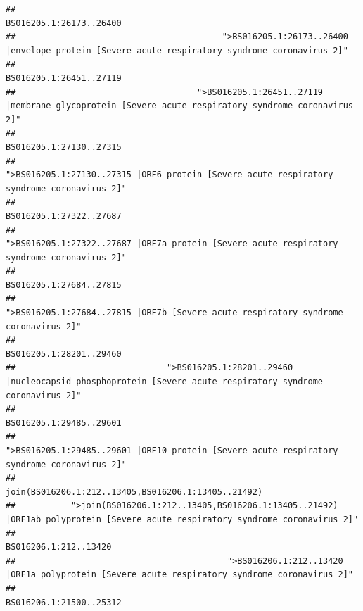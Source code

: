 \documentclass[
]{article}
\begin{document}
\begin{verbatim}
##                                                                                                                BS016205.1:26173..26400 
##                                         ">BS016205.1:26173..26400 |envelope protein [Severe acute respiratory syndrome coronavirus 2]" 
##                                                                                                                BS016205.1:26451..27119 
##                                    ">BS016205.1:26451..27119 |membrane glycoprotein [Severe acute respiratory syndrome coronavirus 2]" 
##                                                                                                                BS016205.1:27130..27315 
##                                             ">BS016205.1:27130..27315 |ORF6 protein [Severe acute respiratory syndrome coronavirus 2]" 
##                                                                                                                BS016205.1:27322..27687 
##                                            ">BS016205.1:27322..27687 |ORF7a protein [Severe acute respiratory syndrome coronavirus 2]" 
##                                                                                                                BS016205.1:27684..27815 
##                                                    ">BS016205.1:27684..27815 |ORF7b [Severe acute respiratory syndrome coronavirus 2]" 
##                                                                                                                BS016205.1:28201..29460 
##                              ">BS016205.1:28201..29460 |nucleocapsid phosphoprotein [Severe acute respiratory syndrome coronavirus 2]" 
##                                                                                                                BS016205.1:29485..29601 
##                                            ">BS016205.1:29485..29601 |ORF10 protein [Severe acute respiratory syndrome coronavirus 2]" 
##                                                                                    join(BS016206.1:212..13405,BS016206.1:13405..21492) 
##           ">join(BS016206.1:212..13405,BS016206.1:13405..21492) |ORF1ab polyprotein [Severe acute respiratory syndrome coronavirus 2]" 
##                                                                                                                  BS016206.1:212..13420 
##                                          ">BS016206.1:212..13420 |ORF1a polyprotein [Severe acute respiratory syndrome coronavirus 2]" 
##                                                                                                                BS016206.1:21500..25312 

\end{verbatim}
\end{document}
